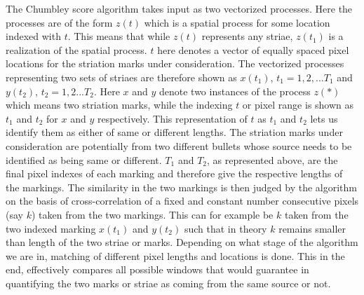 \documentclass[12pt]{article}
\begin{document}
The Chumbley score algorithm takes input as two vectorized processes.
Here the processes are of the form \(z(t)\) which is a spatial process
for some location indexed with \(t\). This means that while \(z(t)\)
represents any striae, \(z(t_1)\) is a realization of the spatial
process. \(t\) here denotes a vector of equally spaced pixel locations
for the striation marks under consideration. The vectorized processes
representing two sets of striaes are therefore shown as \(x(t_1)\),
\(t_1 = 1,2,...T_1\) and \(y(t_2)\), \(t_2 = 1,2...T_2\). Here \(x\) and
\(y\) denote two instances of the process \(z(*)\) which means two
striation marks, while the indexing \(t\) or pixel range is shown as
\(t_1\) and \(t_2\) for \(x\) and \(y\) respectively. This
representation of \(t\) as \(t_1\) and \(t_2\) lets us identify them as
either of same or different lengths. The striation marks under
consideration are potentially from two different bullets whose source
needs to be identified as being same or different. \(T_1\) and \(T_2\),
as represented above, are the final pixel indexes of each marking and
therefore give the respective lengths of the markings. The similarity in
the two markings is then judged by the algorithm on the basis of
cross-correlation of a fixed and constant number consecutive pixels (say
\(k\)) taken from the two markings. This can for example be \(k\) taken
from the two indexed marking \(x(t_1)\) and \(y(t_2)\) such that in
theory \(k\) remains smaller than length of the two striae or marks.
Depending on what stage of the algorithm we are in, matching of
different pixel lengths and locations is done. This in the end,
effectively compares all possible windows that would guarantee in
quantifying the two marks or striae as coming from the same source or
not.
\end{document}
